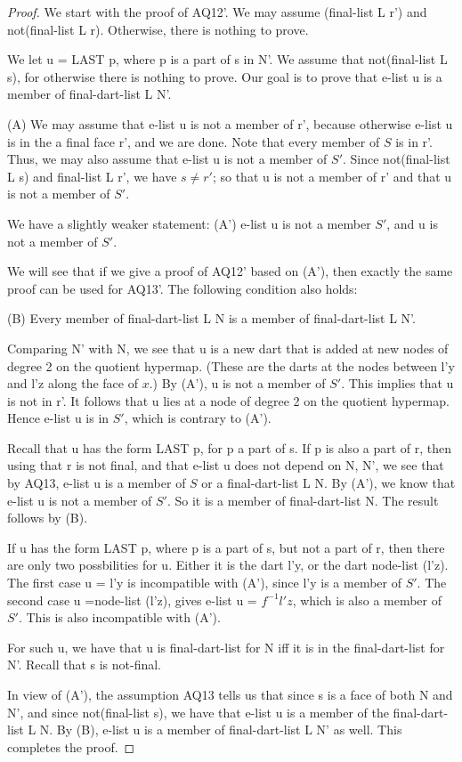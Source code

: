 \begin{proof}
We start with the proof of AQ12'.  We may assume (final-list L r') and not(final-list L r).
Otherwise, there is nothing to prove.

We let u = LAST p, where p is a part of s in N'.  We assume that not(final-list L s),
for otherwise there is nothing to prove.  Our goal is to prove that e-list u is a member
of final-dart-list L N'.

(A) We may assume that e-list u is not a member of r', because otherwise e-list u is in the
a final face r', and we are done.  Note that every member of $S$ is in r'.  Thus,
we may also assume that e-list u is not a member of $S'$.  Since not(final-list L s)
and final-list L r', we have $s\ne r'$; so that u is not a member of r' and that u is not a member of 
$S'$.

We have a slightly weaker statement:
(A') e-list u is not a member $S'$, and u is not a member of $S'$.

We will see that if we give a proof of AQ12' based on (A'), then exactly the same proof
can be used for AQ13'.  The following condition also holds:

(B)  Every member of final-dart-list L N is a member of final-dart-list L N'.

  Comparing N' with N, we see
that u is a new dart that is added at new nodes of degree 2 on the quotient
 hypermap.  (These are the darts at the nodes between l'y and l'z along the face of $x$.)
By (A'), u is not a member of $S'$.  This implies that u is not in r'.
It follows that u lies at  a node of degree 2 on the
 quotient hypermap.
 Hence e-list u is in $S'$, which is contrary to (A').

Recall that u has the form LAST p, for p a part of s.
If p is also a part of
 r, then using that
  r is not final, and that e-list u does not depend on N, N', we see
that by AQ13, e-list u is a member of $S$ or a final-dart-list L N.
By (A'), we know that e-list u is not a member of $S'$.  So it is a member of final-dart-list N.
The result follows by (B).

If  u has the form LAST p, where p is a part of s, but not a part of r, then there are only
two possbilities for u.  Either it is the dart l'y, or the dart node-list (l'z).  The first case u = l'y is
incompatible with (A'), since l'y is a member of $S'$.  The second case u =node-list (l'z), gives
e-list u = $f^{-1} l'z$, which is also a member of $S'$.  This is also incompatible with (A').

  For such u, we have that u is
 final-dart-list for N iff it is
 in the final-dart-list for N'.  
Recall that s  is not-final. 

In view of (A'), the assumption AQ13 tells us that since s is a face of both N and N',
and since not(final-list s), we have that e-list u is a member of the final-dart-list L N.
By (B), e-list u is a member of final-dart-list L N' as well. This completes the proof.
\end{proof}

